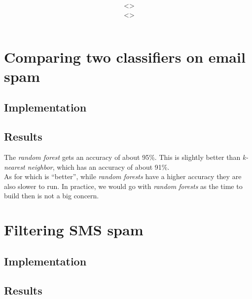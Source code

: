 \documentclass[12pt,a4paper]{article}
\title{\vspace{2in}\textmd{\hmwkClass\\\textbf{\hmwkTitle}}\\\normalsize\vspace{0.1in}\small{\hmwkDueDate}\\\vspace{4in}}
\date{}
\author{\textbf{\hmwkAuthorNameA} $\;$<\texttt{\href{mailto:laane2@illinois.edu}{\hmwkAuthorEmailA}}>\\\textbf{\hmwkAuthorNameB} $\;$<\texttt{\href{mailto:ruizcep2@illinois.edu}{\hmwkAuthorEmailB}}>}
\begin{document}
\begin{singlespace}

\begin{titlepage}
\maketitle
\thispagestyle{empty}
\end{titlepage}

\tableofcontents
\newpage


\clearpage

\section{Comparing two classifiers on email spam}
\subsection{Implementation}

\subsection{Results}

The \emph{random forest} gets an accuracy of about 95\%. This is slightly better than \emph{k-nearest neighbor}, which has an accuracy of about 91\%. \\

As for which is ``better'', while \emph{random forests} have a higher accuracy they are also slower to run. In practice, we would go with \emph{random forests} as the time to build then is not a big concern.

\newpage
\section{Filtering SMS spam}
\subsection{Implementation}

\subsection{Results}



\end{singlespace}
\end{document}
